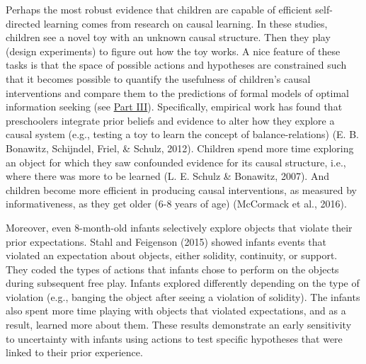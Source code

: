 \documentclass[english,floatsintext,man]{apa6}
\theoremstyle{definition}
\theoremstyle{definition}
\theoremstyle{definition}
\theoremstyle{remark}
\begin{document}
Perhaps the most robust evidence that children are capable of efficient
self-directed learning comes from research on causal learning. In these
studies, children see a novel toy with an unknown causal structure. Then
they play (design experiments) to figure out how the toy works. A nice
feature of these tasks is that the space of possible actions and
hypotheses are constrained such that it becomes possible to quantify the
usefulness of children's causal interventions and compare them to the
predictions of formal models of optimal information seeking (see
\protect\hyperlink{p3}{Part III}). Specifically, empirical work has
found that preschoolers integrate prior beliefs and evidence to alter
how they explore a causal system (e.g., testing a toy to learn the
concept of balance-relations) (E. B. Bonawitz, Schijndel, Friel, \&
Schulz, 2012). Children spend more time exploring an object for which
they saw confounded evidence for its causal structure, i.e., where there
was more to be learned (L. E. Schulz \& Bonawitz, 2007). And children
become more efficient in producing causal interventions, as measured by
informativeness, as they get older (6-8 years of age) (McCormack et al.,
2016).

Moreover, even 8-month-old infants selectively explore objects that
violate their prior expectations. Stahl and Feigenson (2015) showed
infants events that violated an expectation about objects, either
solidity, continuity, or support. They coded the types of actions that
infants chose to perform on the objects during subsequent free play.
Infants explored differently depending on the type of violation (e.g.,
banging the object after seeing a violation of solidity). The infants
also spent more time playing with objects that violated expectations,
and as a result, learned more about them. These results demonstrate an
early sensitivity to uncertainty with infants using actions to test
specific hypotheses that were linked to their prior experience.
\end{document}
